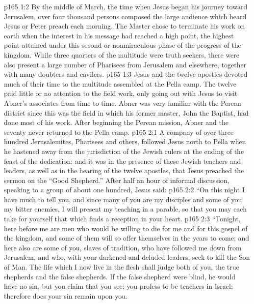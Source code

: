 \vs p165 1:2 By the middle of March, the time when Jesus began his journey toward Jerusalem, over four thousand persons composed the large audience which heard Jesus or Peter preach each morning. The Master chose to terminate his work on earth when the interest in his message had reached a high point, the highest point attained under this second or nonmiraculous phase of the progress of the kingdom. While three quarters of the multitude were truth seekers, there were also present a large number of Pharisees from Jerusalem and elsewhere, together with many doubters and cavilers.
\vs p165 1:3 Jesus and the twelve apostles devoted much of their time to the multitude assembled at the Pella camp. The twelve paid little or no attention to the field work, only going out with Jesus to visit Abner’s associates from time to time. Abner was very familiar with the Perean district since this was the field in which his former master, John the Baptist, had done most of his work. After beginning the Perean mission, Abner and the seventy never returned to the Pella camp.
\vs p165 2:1 A company of over three hundred Jerusalemites, Pharisees and others, followed Jesus north to Pella when he hastened away from the jurisdiction of the Jewish rulers at the ending of the feast of the dedication; and it was in the presence of these Jewish teachers and leaders, as well as in the hearing of the twelve apostles, that Jesus preached the sermon on the “Good Shepherd.” After half an hour of informal discussion, speaking to a group of about one hundred, Jesus said:
\pc \vs p165 2:2 \textcolor{ubdarkred}{“On this night I have much to tell you, and since many of you are my disciples and some of you my bitter enemies, I will present my teaching in a parable, so that you may each take for yourself that which finds a reception in your heart.}
\vs p165 2:3 \textcolor{ubdarkred}{“Tonight, here before me are men who would be willing to die for me and for this gospel of the kingdom, and some of them will so offer themselves in the years to come; and here also are some of you, slaves of tradition, who have followed me down from Jerusalem, and who, with your darkened and deluded leaders, seek to kill the Son of Man. The life which I now live in the flesh shall judge both of you, the true shepherds and the false shepherds. If the false shepherd were blind, he would have no sin, but you claim that you see; you profess to be teachers in Israel; therefore does your sin remain upon you.}
